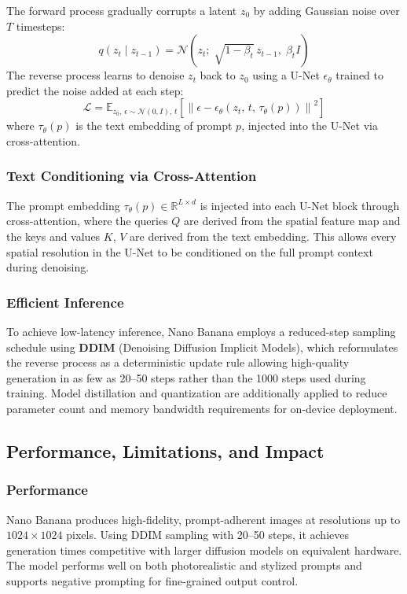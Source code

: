 \documentclass[11pt,a4paper]{report}
\begin{document}
The forward process gradually corrupts a latent $z_0$ by adding Gaussian noise over $T$ timesteps:
\[
q(z_t \mid z_{t-1}) = \mathcal{N}\!\left(z_t;\; \sqrt{1-\beta_t}\, z_{t-1},\; \beta_t I\right)
\]
The reverse process learns to denoise $z_t$ back to $z_0$ using a U-Net $\epsilon_\theta$ trained to predict
the noise added at each step:
\[
\mathcal{L} = \mathbb{E}_{z_0,\, \epsilon \sim \mathcal{N}(0,I),\, t}\!\left[\left\|\epsilon - \epsilon_\theta(z_t,\, t,\, \tau_\theta(p))\right\|^2\right]
\]
where $\tau_\theta(p)$ is the text embedding of prompt $p$, injected into the U-Net via cross-attention.

\subsubsection{Text Conditioning via Cross-Attention}
The prompt embedding $\tau_\theta(p) \in \mathbb{R}^{L \times d}$ is injected into each U-Net block through
cross-attention, where the queries $Q$ are derived from the spatial feature map and the keys and values $K$,
$V$ are derived from the text embedding. This allows every spatial resolution in the U-Net to be conditioned
on the full prompt context during denoising.

\subsubsection{Efficient Inference}
To achieve low-latency inference, Nano Banana employs a reduced-step sampling schedule using \textbf{DDIM}
(Denoising Diffusion Implicit Models), which reformulates the reverse process as a deterministic update rule
allowing high-quality generation in as few as 20--50 steps rather than the 1000 steps used during training.
Model distillation and quantization are additionally applied to reduce parameter count and memory bandwidth
requirements for on-device deployment.

\subsection{Performance, Limitations, and Impact}

\subsubsection{Performance}
Nano Banana produces high-fidelity, prompt-adherent images at resolutions up to $1024 \times 1024$ pixels.
Using DDIM sampling with 20--50 steps, it achieves generation times competitive with larger diffusion models
on equivalent hardware. The model performs well on both photorealistic and stylized prompts and supports
negative prompting for fine-grained output control.
\end{document}
